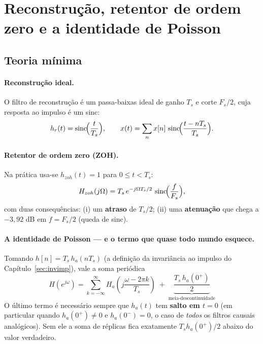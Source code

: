 \section{Reconstrução, retentor de ordem zero e a identidade de Poisson}

\subsection*{Teoria mínima}

\paragraph{Reconstrução ideal.} O filtro de reconstrução é um passa-baixas
ideal de ganho $T_s$ e corte $F_s/2$, cuja resposta ao impulso é um sinc:
\[
  h_r(t)=\operatorname{sinc}\!\Bigl(\frac{t}{T_s}\Bigr),\qquad
  x(t)=\sum_n x[n]\,\operatorname{sinc}\!\Bigl(\frac{t-nT_s}{T_s}\Bigr).
\]

\paragraph{Retentor de ordem zero (ZOH).} Na prática usa-se
$h_{zoh}(t)=1$ para $0\le t<T_s$:
\[
  H_{zoh}(j\Omega)=T_s\,e^{-j\Omega T_s/2}\,
  \operatorname{sinc}\!\Bigl(\frac{f}{F_s}\Bigr),
\]
com duas consequências: (i) um \textbf{atraso} de $T_s/2$; (ii) uma
\textbf{atenuação} que chega a $-3{,}92$ dB em $f=F_s/2$ (queda de sinc).

\paragraph{A identidade de Poisson — e o termo que quase todo mundo esquece.}
Tomando $h[n]=T_s\,h_a(nT_s)$ (a definição da invariância ao impulso do
Capítulo~\ref{sec:invimp}), vale a soma periódica
\[
  H(e^{j\omega})=\sum_{k=-\infty}^{\infty}
  H_a\!\left(j\frac{\omega-2\pi k}{T_s}\right)
  \;+\;\underbrace{\frac{T_s\,h_a(0^+)}{2}}_{\text{meia-descontinuidade}}
\]
O último termo é necessário sempre que $h_a(t)$ tem \textbf{salto em
$t=0$} (em particular quando $h_a(0^+)\neq0$ e $h_a(0^-)=0$, o caso de
\emph{todos} os filtros causais analógicos). Sem ele a soma de réplicas fica
exatamente $T_s h_a(0^+)/2$ abaixo do valor verdadeiro.


